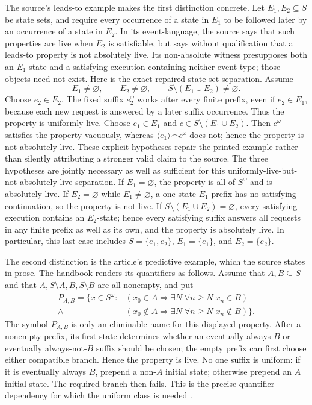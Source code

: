The source's leads-to example makes the first distinction concrete.  Let
\(E_1,E_2\subseteq S\) be state sets, and require every occurrence of a state
in \(E_1\) to be followed later by an occurrence of a state in \(E_2\).  In
its event-language, the source says that such properties are live when
\(E_2\) is satisfiable, but says without qualification that a leads-to
property is not absolutely live.  Its non-absolute witness presupposes both an
\(E_1\)-state and a satisfying execution containing neither event type; those
objects need not exist.  Here is the exact repaired state-set separation.
Assume
\[
 E_1\ne\varnothing,
 \qquad E_2\ne\varnothing,
 \qquad S\setminus(E_1\cup E_2)\ne\varnothing.
\]
Choose \(e_2\in E_2\).  The fixed suffix \(e_2^\omega\) works after every
finite prefix, even if \(e_2\in E_1\), because each new request is answered by
a later suffix occurrence.  Thus the property is uniformly live.  Choose
\(e_1\in E_1\) and \(c\in S\setminus(E_1\cup E_2)\).  Then \(c^\omega\)
satisfies the property vacuously, whereas
\(\langle e_1\rangle\mathbin{\smallfrown}c^\omega\) does not; hence the
property is not
absolutely live.  These explicit hypotheses repair the printed example rather
than silently attributing a stronger valid claim to the source.  The three
hypotheses are jointly necessary as well as sufficient for this
uniformly-live-but-not-absolutely-live separation.  If \(E_1=\varnothing\),
the property is all of \(S^\omega\) and is absolutely live.  If
\(E_2=\varnothing\) while \(E_1\neq\varnothing\), a one-state \(E_1\)-prefix
has no satisfying continuation, so the property is not live.  If
\(S\setminus(E_1\cup E_2)=\varnothing\), every satisfying execution contains
an \(E_2\)-state; hence every satisfying suffix answers all requests in any
finite prefix as well as its own, and the property is absolutely live.  In
particular, this last case includes \(S=\{e_1,e_2\}\),
\(E_1=\{e_1\}\), and \(E_2=\{e_2\}\).

The second distinction is the article's predictive example, which the source
states in prose.  The handbook renders its quantifiers as follows.  Assume that
\(A,B\subseteq S\) and that
\(A,S\setminus A,B,S\setminus B\) are all nonempty, and put
\[
\begin{split}
 P_{A,B}=\{x\in S^\omega:
 &(x_0\in A\Longrightarrow
   \exists N\;\forall n\ge N\;x_n\in B)\\
 {}\land{}&
 (x_0\notin A\Longrightarrow
   \exists N\;\forall n\ge N\;x_n\notin B)\}.
\end{split}
\]
The symbol \(P_{A,B}\) is only an eliminable name for this displayed property.
After a nonempty prefix, its first state determines whether an eventually
always-\(B\) or eventually always-not-\(B\) suffix should be chosen; the empty
prefix can first choose either compatible branch.  Hence the property is live.
No one suffix is uniform: if it is eventually always \(B\), prepend a
non-\(A\) initial state; otherwise prepend an \(A\) initial state.  The
required branch then fails.  This is the precise quantifier dependency for
which the uniform class is needed \cite[p.~183]{AlpernSchneider1985}.

